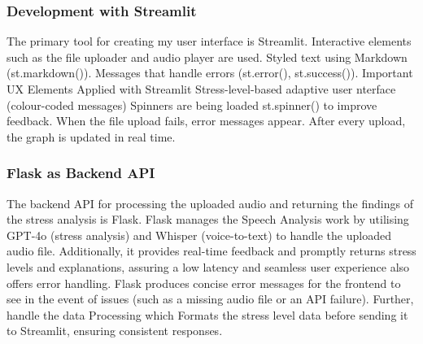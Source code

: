 \documentclass[a4j, twocolumn]{article}
\begin{document}
 \subsubsection{Development with Streamlit}
The primary tool for creating my user interface is Streamlit. Interactive elements such as the file uploader and audio player are used. Styled text using Markdown (st.markdown()). Messages that handle errors (st.error(), st.success()). Important UX Elements Applied with Streamlit
Stress-level-based adaptive user nterface (colour-coded messages)
Spinners are being loaded st.spinner() to improve feedback.
When the file upload fails, error messages appear.
After every upload, the graph is updated in real time.
\subsubsection{ Flask as Backend API}
    The backend API for processing the uploaded audio and returning the findings of the stress analysis is Flask. Flask manages the Speech Analysis work by utilising GPT-4o (stress analysis) and Whisper (voice-to-text) to handle the uploaded audio file. Additionally, it provides real-time feedback and promptly returns stress levels and explanations, assuring a low latency and seamless user experience also offers error handling. Flask produces concise error messages for the frontend to see in the event of issues (such as a missing audio file or an API failure). Further,  handle the data Processing which Formats the stress level data before sending it to Streamlit, ensuring consistent responses. 
\end{document}
